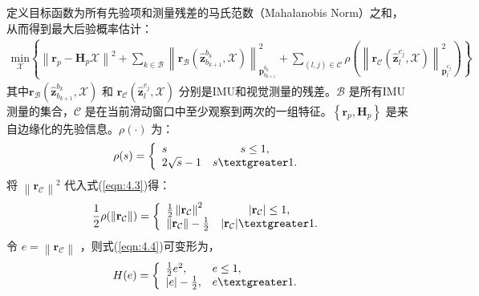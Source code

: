 定义目标函数为所有先验项和测量残差的马氏范数（Mahalanobis Norm）之和，从而得到最大后验概率估计：
\begin{equation}
\label{eqn:4.2}
\begin{split}
\underset{\mathcal{X}}{\text{min}}
\left\{
\left\| 
\mathbf{r}_p-\mathbf{H}_p\mathcal{X} 
\right\|^2+
\sum_{k\in\mathcal{B}}
\left\| 
\mathbf{r}_\mathcal{B}(\hat{\mathbf{z}}_{b_{k+1}}^{b_k},\mathcal{X}) 
\right\|
_{\mathbf{p}_{b_{k+1}}^{b_k}}^2+ \right. 
\left.\sum_{(l,j)\in\mathcal{C}}\rho(
\left\| 
\mathbf{r}_\mathcal{C}(\hat{\mathbf{z}}_l^{c_j},\mathcal{X}) 
\right\|
_{\mathbf{p}_l^{c_j}}^2) 
\right\}
\end{split}
\end{equation}
其中$\mathbf{r}_\mathcal{B}(\hat{\mathbf{z}}_{b_{k+1}}^{b_k},\mathcal{X})  $ 和 $\mathbf{r}_\mathcal{C}(\hat{\mathbf{z}}_l^{c_j},\mathcal{X})  $ 分别是IMU和视觉测量的残差。$\mathcal{B} $ 是所有IMU测量的集合，$\mathcal{C} $ 是在当前滑动窗口中至少观察到两次的一组特征。$\left\{ \mathbf{r}_p,\mathbf{H}_p\right\} $ 是来自边缘化的先验信息。$\rho (\cdot) $ 为：
\begin{equation}
\label{eqn:4.3}
\rho(s)=
\left\{\begin{array}{lc}
s & s\leq 1,\\
2\sqrt{s}-1 & s\textgreater 1.
\end{array}\right. 
\end{equation}
将 $\left\| \mathbf{r}_\mathcal{C} \right\|^2 $ 代入式(\ref{eqn:4.3})得：
\begin{equation}
\label{eqn:4.4}
\frac{1}{2}\rho( \left\| \mathbf{r}_\mathcal{C} \right\| )=\left\{\begin{array}{lc}
\frac{1}{2} \left\| \mathbf{r}_\mathcal{C} \right\|^2 & |\mathbf{r}_\mathcal{C}| \leq 1,\\
\left\| \mathbf{r}_\mathcal{C}\right\| - \frac{1}{2} & |\mathbf{r}_\mathcal{C}| \textgreater 1.
\end{array}\right. 
\end{equation}
令 $e=\left\| \mathbf{r}_\mathcal{C} \right\|  $ ，则式(\ref{eqn:4.4})可变形为，
\begin{equation}
\label{eqn:4.5}
\begin{split}
H(e)=\left \{
\begin{array}{ll}
\frac12 e^2, & e \leq 1,\\
|e| - \frac12, & e \textgreater 1.
\end{array}
\right.
\end{split}
\end{equation}
